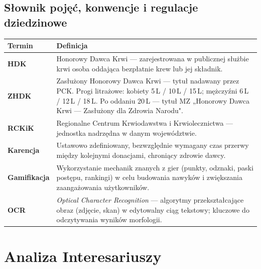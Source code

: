 \documentclass[11pt, a4paper]{article}
\newcommand{\term}[1]{\textbf{#1}}
\begin{document}
\subsection{Słownik pojęć, konwencje i regulacje dziedzinowe}

\begin{center}
\begin{tabularx}{\linewidth}{L{3cm} X}
  \toprule
  \textbf{Termin} & \textbf{Definicja} \\
  \midrule
  \term{HDK}
    & Honorowy Dawca Krwi — zarejestrowana w publicznej służbie krwi osoba
      oddająca bezpłatnie krew lub jej składnik. \\
  \addlinespace
  \term{ZHDK}
    & Zasłużony Honorowy Dawca Krwi — tytuł nadawany przez PCK.
      Progi litrażowe: kobiety 5\,L / 10\,L / 15\,L; mężczyźni 6\,L / 12\,L / 18\,L.
      Po oddaniu 20\,L — tytuł MZ „Honorowy Dawca Krwi — Zasłużony dla Zdrowia Narodu". \\
  \addlinespace
  \term{RCKiK}
    & Regionalne Centrum Krwiodawstwa i Krwiolecznictwa — jednostka nadrzędna
      w danym województwie. \\
  \addlinespace
  \term{Karencja}
    & Ustawowo zdefiniowany, bezwzględnie wymagany czas przerwy między kolejnymi
      donacjami, chroniący zdrowie dawcy. \\
  \addlinespace
  \term{Gamifikacja}
    & Wykorzystanie mechanik znanych z gier (punkty, odznaki, paski postępu, rankingi)
      w celu budowania nawyków i zwiększania zaangażowania użytkowników. \\
  \addlinespace
  \term{OCR}
    & \textit{Optical Character Recognition} — algorytmy przekształcające obraz (zdjęcie,
      skan) w edytowalny ciąg tekstowy; kluczowe do odczytywania wyników morfologii. \\
  \bottomrule
\end{tabularx}
\end{center}

\section{Analiza Interesariuszy}
\end{document}
